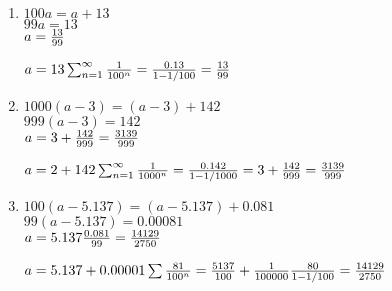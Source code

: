\begin{enumerate}
	\item $100a=a+13$\\
		$99 a = 13$\\
		$a=\frac{13}{99}$

		$a = 13 \* \su\f 1{100^n} = \f{0.13}{1-1/100} = \f{13}{99}$
	\item $1000(a-3)=(a-3)+142$\\
		$999(a-3)=142$\\
		$a=3+\frac{142}{999} = \frac{3139}{999}$

		$a=2+142\* \su\f 1{1000^n} = \f{0.142}{1-1/1000} =3+ \f{142}{999} = \f{3139}{999}$
	\item $100(a-5.137)=(a-5.137)+0.081$\\
		$99 (a-5.137) = 0.00081$\\
		$a=5.137\frac{0.081}{99}= \frac{14129}{2750}$

		$a = 5.137 + 0.00001 \* \sum\f {81}{100^n} = \f{5137}{100}+\f{1}{100000}\*\f{80}{1-1/100} = \f{14129}{2750}$
\end{enumerate}

\EndDoc
